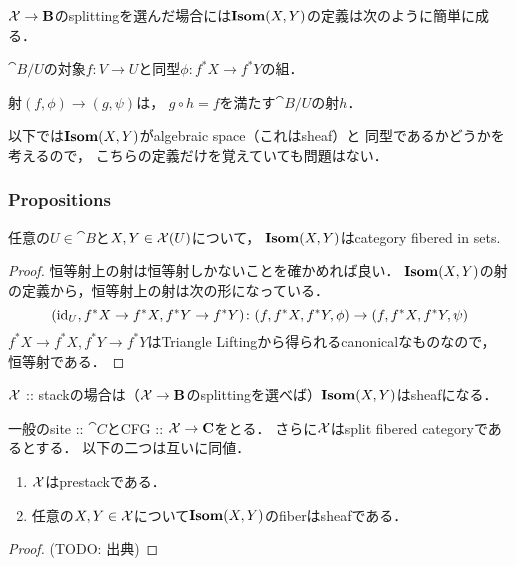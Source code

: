 \begin{Remark}\label{rem:simple_isom}
    $\stX \to \cat{B}$のsplittingを選んだ場合には$\Isom(X, Y)$の定義は次のように簡単に成る．
    \begin{description}[labelindent=1cm]
        \item[Object.]
             $\cat{B}/U$の対象$f \colon V \to U$と同型$\phi \colon f^*X \to f^*Y$の組．

        \item[Arrow.]
            射$(f, \phi) \to (g, \psi)$は，
            $g \circ h=f$を満たす$\cat{B}/U$の射$h$．
    \end{description}
    以下では$\Isom(X, Y)$がalgebraic space（これはsheaf）と
    同型であるかどうかを考えるので，
    こちらの定義だけを覚えていても問題はない．
\end{Remark}

\subsubsection{Propositions}
\begin{Lemma}
    任意の$U \in \cat{B}$と$X, Y \in \stX(U)$について，
    $\Isom(X, Y)$はcategory fibered in sets.
\end{Lemma}
\begin{proof}
    恒等射上の射は恒等射しかないことを確かめれば良い．
    $\Isom(X, Y)$の射の定義から，恒等射上の射は次の形になっている．
    \[ (\id[U], f^*X \to f^*X, f^*Y \to f^*Y) \colon (f, f^*X, f^*Y, \phi) \to (f, f^*X, f^*Y, \psi) \]
    $f^*X \to f^*X, f^*Y \to f^*Y$はTriangle Liftingから得られるcanonicalなものなので，
    恒等射である．
\end{proof}

$\stX$ :: stackの場合は（$\stX \to \cat{B}$のsplittingを選べば）$\Isom(X, Y)$はsheafになる．
\begin{Lemma}
    一般のsite :: $\cat{C}$とCFG :: $\stX \to \cat{C}$をとる．
    さらに$\stX$はsplit fibered categoryであるとする．
    以下の二つは互いに同値．
    \begin{enumerate}
        \item $\stX$はprestackである．
        \item 任意の$X, Y \in \stX$について$\Isom(X, Y)$のfiberはsheafである．
    \end{enumerate}
\end{Lemma}
\begin{proof}
    (TODO: 出典)
\end{proof}

